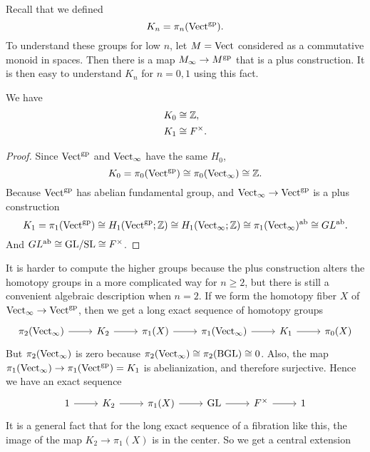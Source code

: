 Recall that we defined
\[
    K_n = \pi_n(\mathrm{Vect}^{\mathrm{gp}}).
\]
To understand these groups for low $n$, let $M = \mathrm{Vect}$ considered as a commutative monoid in spaces. Then there is a map $M_\infty \to M^{\mathrm{gp}}$ that is a plus construction. It is then easy to understand $K_n$ for $n = 0, 1$ using this fact.
\begin{proposition}
    We have
    \begin{align*}
        K_0 & \cong \mathbb{Z}, \\
        K_1 & \cong F^\times.
    \end{align*}
\end{proposition}
\begin{proof}
    Since $\mathrm{Vect}^{\mathrm{gp}}$ and $\mathrm{Vect}_\infty$ have the same $H_0$,
    \[
        K_0 = \pi_0(\mathrm{Vect}^{\mathrm{gp}}) \cong \pi_0(\mathrm{Vect}_\infty) \cong \mathbb{Z}.
    \]
    Because $\mathrm{Vect}^{\mathrm{gp}}$ has abelian fundamental group, and $\mathrm{Vect}_\infty \to \mathrm{Vect}^{\mathrm{gp}}$ is a plus construction
    \[
        K_1 = \pi_1(\mathrm{Vect}^{\mathrm{gp}}) \cong H_1(\mathrm{Vect}^{\mathrm{gp}} ; \mathbb{Z}) \cong H_1(\mathrm{Vect}_\infty ; \mathbb{Z}) \cong \pi_1(\mathrm{Vect}_\infty)^{\mathrm{ab}} \cong GL^{\mathrm{ab}}.
    \]
    And $GL^{\mathrm{ab}} \cong \mathrm{GL} / \mathrm{SL} \cong F^\times$.
\end{proof}
It is harder to compute the higher groups because the plus construction alters the homotopy groups in a more complicated way for $n \geq 2$, but there is still a convenient algebraic description when $n = 2$. If we form the homotopy fiber $X$ of $\mathrm{Vect}_\infty \to \mathrm{Vect}^{\mathrm{gp}}$, then we get a long exact sequence of homotopy groups
\[
    \begin{tikzcd}
        \arrow[from=1-1, to=1-2]
        \arrow[from=1-2, to=1-3]
        \arrow[from=1-3, to=1-4]
        \arrow[from=1-4, to=1-5]
        \arrow[from=1-5, to=1-6]
        \pi_2(\Vect_\infty) & K_2 & \pi_1(X) & \pi_1(\Vect_\infty) & K_1 & \pi_0(X)
    \end{tikzcd}
\]
But $\pi_2(\mathrm{Vect}_\infty)$ is zero because $\pi_2(\mathrm{Vect}_\infty) \cong \pi_2(\mathrm{BGL}) \cong 0$. Also, the map $\pi_1(\mathrm{Vect}_\infty) \to \pi_1(\mathrm{Vect}^{\mathrm{gp}}) = K_1$ is abelianization, and therefore surjective. Hence we have an exact sequence
\[
    \begin{tikzcd}
        \arrow[from=1-1, to=1-2]
        \arrow[from=1-2, to=1-3]
        \arrow[from=1-3, to=1-4]
        \arrow[from=1-4, to=1-5]
        \arrow[from=1-5, to=1-6]
        1 & K_2 & \pi_1(X) & \GL & F^\times & 1
    \end{tikzcd}
\]
It is a general fact that for the long exact sequence of a fibration like this, the image of the map $K_2 \to \pi_1(X)$ is in the center. So we get a central extension

